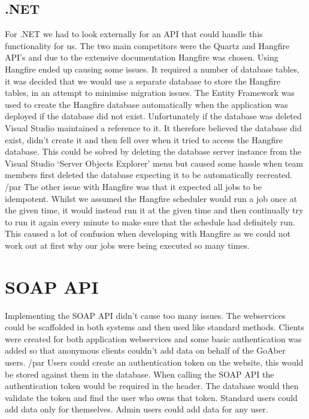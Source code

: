 \subsection{.NET}
For .NET we had to look externally for an API that could handle this functionality for us. The two main competitors were the Quartz\cite{quartz} and Hangfire\cite{hangfire} API’s and due to the extensive documentation Hangfire was chosen.
Using Hangfire ended up causing some issues. It required a number of database tables, it was decided that we would use a separate database to store the Hangfire tables, in an attempt to minimise migration issues. The Entity Framework was used to create the Hangfire database automatically when the application was deployed if the database did not exist. Unfortunately if the database was deleted Visual Studio maintained a reference to it. It therefore believed the database did exist, didn’t create it and then fell over when it tried to access the Hangfire database. This could be solved by deleting the database server instance from the Visual Studio ‘Server Objects Explorer’ menu but caused some hassle when team members first deleted the database expecting it to be automatically recreated. /par
The other issue with Hangfire was that it expected all jobs to be idempotent. Whilst we assumed the Hangfire scheduler would run a job once at the given time, it would instead run it at the given time and then continually try to run it again every minute to make sure that the schedule had definitely run. This caused a lot of confusion when developing with Hangfire as we could not work out at first why our jobs were being executed so many times. 
\section{SOAP API}
Implementing the SOAP API didn’t cause too many issues. The webservices could be scaffolded in both systems and then used like standard methods. Clients were created for both application webservices and some basic authentication was added so that anonymous clients couldn’t add data on behalf of the GoAber users. /par 
Users could create an authentication token on the website, this would be stored against them in the database. When calling the SOAP API the authentication token would be required in the header. The database would then validate the token and find the user who owns that token. Standard users could add data only for themselves. Admin users could add data for any user.
